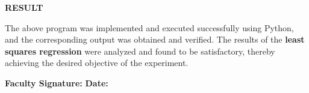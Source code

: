 \documentclass[11pt,twoside]{article}
\newcommand{\expheading}[1]{{\fontsize{14}{17}\selectfont\textbf{#1}\par}}
\newcommand{\tooddpage}{\clearpage\ifodd\value{page}\else\null\thispagestyle{empty}\newpage\fi}
\begin{document}
\expheading{RESULT}
\vspace{4pt}
{\fontsize{12}{15}\selectfont
The above program was implemented and executed successfully using Python, and the corresponding output was obtained and verified. The results of the \textbf{least squares regression} were analyzed and found to be satisfactory, thereby achieving the desired objective of the experiment.\par
}

\vspace{12pt}

\noindent\textbf{Faculty Signature:} \underline{\hspace{3.6cm}} \hfill \textbf{Date:} \underline{\hspace{2.8cm}}\par

\tooddpage
\end{document}
